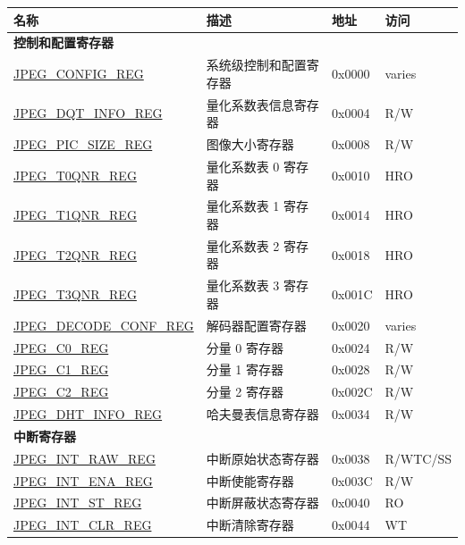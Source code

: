 \begin{longtable}{ | p{6cm} | p{7.2cm} | p{1.3cm} | p{1cm} | }
\hline\rowcolor{lightgray}
\textbf{名称} & \textbf{描述} &  \textbf{地址} & \textbf{访问} \\ \hline
\endhead
\multicolumn{4}{|l|}{\textbf{控制和配置寄存器}} \\ \hline
\hyperref[regdesc:JPEGCONFIGREG]{JPEG\_CONFIG\_REG} & 系统级控制和配置寄存器 & 0x0000 & varies \\ \hline
\hyperref[regdesc:JPEGDQTINFOREG]{JPEG\_DQT\_INFO\_REG} & 量化系数表信息寄存器 & 0x0004 & R/W \\ \hline
\hyperref[regdesc:JPEGPICSIZEREG]{JPEG\_PIC\_SIZE\_REG} & 图像大小寄存器 & 0x0008 & R/W \\ \hline
\hyperref[regdesc:JPEGT0QNRREG]{JPEG\_T0QNR\_REG} & 量化系数表 0 寄存器 & 0x0010 & HRO \\ \hline
\hyperref[regdesc:JPEGT1QNRREG]{JPEG\_T1QNR\_REG} & 量化系数表 1 寄存器 & 0x0014 & HRO \\ \hline
\hyperref[regdesc:JPEGT2QNRREG]{JPEG\_T2QNR\_REG} & 量化系数表 2 寄存器 & 0x0018 & HRO \\ \hline
\hyperref[regdesc:JPEGT3QNRREG]{JPEG\_T3QNR\_REG} & 量化系数表 3 寄存器 & 0x001C & HRO \\ \hline
\hyperref[regdesc:JPEGDECODECONFREG]{JPEG\_DECODE\_CONF\_REG} & 解码器配置寄存器 & 0x0020 & varies \\ \hline
\hyperref[regdesc:JPEGC0REG]{JPEG\_C0\_REG} & 分量 0 寄存器 & 0x0024 & R/W \\ \hline
\hyperref[regdesc:JPEGC1REG]{JPEG\_C1\_REG} & 分量 1 寄存器 & 0x0028 & R/W \\ \hline
\hyperref[regdesc:JPEGC2REG]{JPEG\_C2\_REG} & 分量 2 寄存器 & 0x002C & R/W \\ \hline
\hyperref[regdesc:JPEGDHTINFOREG]{JPEG\_DHT\_INFO\_REG} & 哈夫曼表信息寄存器 & 0x0034 & R/W \\ \hline
\multicolumn{4}{|l|}{\textbf{中断寄存器}} \\ \hline
\hyperref[regdesc:JPEGINTRAWREG]{JPEG\_INT\_RAW\_REG} & 中断原始状态寄存器 & 0x0038 & R/WTC/SS \\ \hline
\hyperref[regdesc:JPEGINTENAREG]{JPEG\_INT\_ENA\_REG} & 中断使能寄存器 & 0x003C & R/W \\ \hline
\hyperref[regdesc:JPEGINTSTREG]{JPEG\_INT\_ST\_REG} & 中断屏蔽状态寄存器 & 0x0040 & RO \\ \hline
\hyperref[regdesc:JPEGINTCLRREG]{JPEG\_INT\_CLR\_REG} & 中断清除寄存器 & 0x0044 & WT \\ \hline

\end{longtable}
